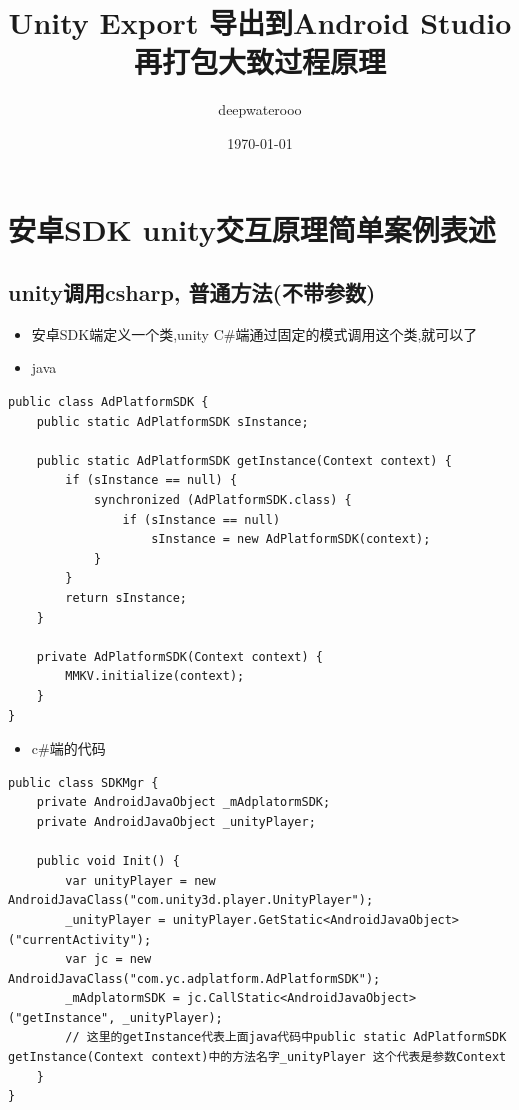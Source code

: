 \documentclass[9pt, b5paper]{article}
\author{deepwaterooo}
\date{\today}
\title{Unity Export 导出到Android Studio再打包大致过程原理}
\begin{document}
\maketitle
\tableofcontents


\section{安卓SDK unity交互原理简单案例表述}
\label{sec-1}
\subsection{unity调用csharp, 普通方法(不带参数)}
\label{sec-1-1}
\begin{itemize}
\item 安卓SDK端定义一个类,unity C\#端通过固定的模式调用这个类,就可以了
\item java
\end{itemize}
\begin{verbatim}
public class AdPlatformSDK {
    public static AdPlatformSDK sInstance;

    public static AdPlatformSDK getInstance(Context context) {
        if (sInstance == null) {
            synchronized (AdPlatformSDK.class) {
                if (sInstance == null) 
                    sInstance = new AdPlatformSDK(context);
            }
        }
        return sInstance;
    }

    private AdPlatformSDK(Context context) {
        MMKV.initialize(context); 
    }
}
\end{verbatim}
\begin{itemize}
\item c\#端的代码
\end{itemize}
\begin{verbatim}
public class SDKMgr {
    private AndroidJavaObject _mAdplatormSDK;
    private AndroidJavaObject _unityPlayer;

    public void Init() {
        var unityPlayer = new AndroidJavaClass("com.unity3d.player.UnityPlayer");
        _unityPlayer = unityPlayer.GetStatic<AndroidJavaObject>("currentActivity");
        var jc = new AndroidJavaClass("com.yc.adplatform.AdPlatformSDK");
        _mAdplatormSDK = jc.CallStatic<AndroidJavaObject>("getInstance", _unityPlayer);
        // 这里的getInstance代表上面java代码中public static AdPlatformSDK getInstance(Context context)中的方法名字_unityPlayer 这个代表是参数Context 
    }
}
\end{verbatim}
\end{document}
